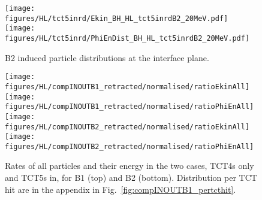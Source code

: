\begin{figure}
\begin{center}
\texttt{[image: figures/HL/tct5inrd/Ekin\_BH\_HL\_tct5inrdB2\_20MeV.pdf]}
\texttt{[image: figures/HL/tct5inrd/PhiEnDist\_BH\_HL\_tct5inrdB2\_20MeV.pdf]}
\end{center}
\vspace{-0.6cm}
 \caption{B2 induced particle distributions at the interface plane.}
  \label{tct5inrdb2retr}
\end{figure}



\begin{figure}
\centering
\texttt{[image: figures/HL/compINOUTB1\_retracted/normalised/ratioEkinAll]}
\texttt{[image: figures/HL/compINOUTB1\_retracted/normalised/ratioPhiEnAll]}
\texttt{[image: figures/HL/compINOUTB2\_retracted/normalised/ratioEkinAll]}
\texttt{[image: figures/HL/compINOUTB2\_retracted/normalised/ratioPhiEnAll]}
\caption{Rates of all particles and their energy in the two cases, TCT4s only and TCT5s in, for B1 (top) and B2 (bottom). Distribution per TCT hit are in the appendix in Fig.~\ref{fig:compINOUTB1_pertcthit}.
  \label{fig:compInOutB1}}
\end{figure}




